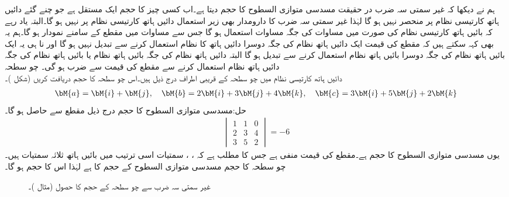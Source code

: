 ہم نے دیکھا کہ غیر سمتی سہ ضرب در حقیقت مسدسی متوازی السطوح کا حجم دیتا ہے۔اب کسی چیز کا حجم ایک مستقل ہے جو چنے گئے دائیں ہاتھ کارتیسی نظام پر منحصر نہیں ہو گا لہٰذا غیر سمتی سہ ضرب کا دارومدار بھی زیر استعمال دائیں ہاتھ کارتیسی  نظام پر نہیں ہو گا۔البتہ یاد رہے کہ بائیں ہاتھ کارتیسی نظام کی صورت میں مساوات  کی جگہ مساوات  استعمال ہو گا جس سے مساوات  میں مقطع کے سامنے  نمودار ہو گا۔ہم یہ بھی کہہ سکتے ہیں کہ مقطع کی قیمت ایک دائیں ہاتھ نظام کی جگہ دوسرا دائیں ہاتھ کا نظام استعمال کرنے سے تبدیل نہیں ہو گا اور نا ہی یہ ایک بائیں ہاتھ نظام کی جگہ دوسرا بائیں ہاتھ نظام استعمال کرنے سے تبدیل ہو گا البتہ دائیں ہاتھ نظام کی جگہ بائیں ہاتھ نظام یا بائیں ہاتھ نظام کی جگہ دائیں ہاتھ نظام استعمال کرنے سے مقطع کی قیمت  سے ضرب ہو گی۔  
\quad چو سطحہ\\
دائیں ہاتھ کارتیسی نظام میں چو سطحہ کے قریبی اطراف درج ذیل ہیں۔اس چو سطحہ کا حجم دریافت کریں (شکل )۔
\begin{align*}
\bM{a}=\bM{i}+\bM{j},\quad \bM{b}=2\bM{i}+3\bM{j}+4\bM{k},\quad \bM{c}=3\bM{i}+5\bM{j}+2\bM{k}
\end{align*}
حل:مسدسی متوازی السطوح کا حجم درج ذیل مقطع سے حاصل ہو گا۔
\begin{align*}
\begin{vmatrix}1&1&0\\2&3&4\\3&5&2  \end{vmatrix}=-6
\end{align*}
یوں مسدسی متوازی السطوح کا حجم  ہے۔مقطع کی قیمت منفی ہے جس کا مطلب ہے کہ ، ،  سمتیات اسی ترتیب میں بائیں ہاتھ ثلاثہ سمتیات ہیں۔چو سطحہ کا حجم مسدسی متوازی السطوح کے حجم کا  ہے لہٰذا اس کا حجم  ہو گا۔
\begin{figure}
\centering
{}
\caption{غیر سمتی سہ ضرب سے چو سطحہ کے حجم کا حصول (مثال )۔}
\label{شکل_مثال_الجبرا_چو_سطحہ}
\end{figure}


